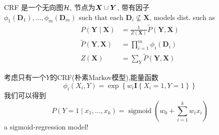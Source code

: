 \documentclass{article}
\begin{document}
\begin{flushleft}
    \begin{definition}
        CRF 是一个无向图$\cal H$, 节点为$\bs X\cup \bs Y$, 带有因子$\phi_{1}\left(\boldsymbol{D}_{1}\right), \ldots, \phi_{m}\left(\boldsymbol{D}_{m}\right) \text { such that each } \boldsymbol{D}_{i} \nsubseteq \boldsymbol{X}$, models dist. such as 
        \begin{equation}
            \begin{aligned}
            P(\boldsymbol{Y} \mid \boldsymbol{X}) &=\frac{1}{Z(\boldsymbol{X})} \tilde{P}(\boldsymbol{Y}, \boldsymbol{X}) \\
            \tilde{P}(\boldsymbol{Y}, \boldsymbol{X}) &=\prod_{i=1}^{m} \phi_{i}\left(\boldsymbol{D}_{i}\right) \\
            Z(\boldsymbol{X}) &=\sum_{Y} \tilde{P}(\boldsymbol{Y}, \boldsymbol{X})
            \end{aligned}
        \end{equation}
    \end{definition}

    \begin{example}
        考虑只有一个$Y$的CRF(朴素Markov模型),能量函数
        \begin{equation}
            \phi_{i}\left(X_{i}, Y\right)=\exp \left\{w_{i} \boldsymbol{I}\left\{X_{i}=1, Y=1\right\}\right\}
        \end{equation}
        我们可以得到
        \begin{equation}
            P\left(Y=1 \mid x_{1}, \ldots, x_{k}\right)=\operatorname{sigmoid}\left(w_{0}+\sum_{i=1}^{k} w_{i} x_{i}\right)
        \end{equation}
        a sigmoid-regression model! 
    \end{example}
\end{flushleft}
\end{document}

